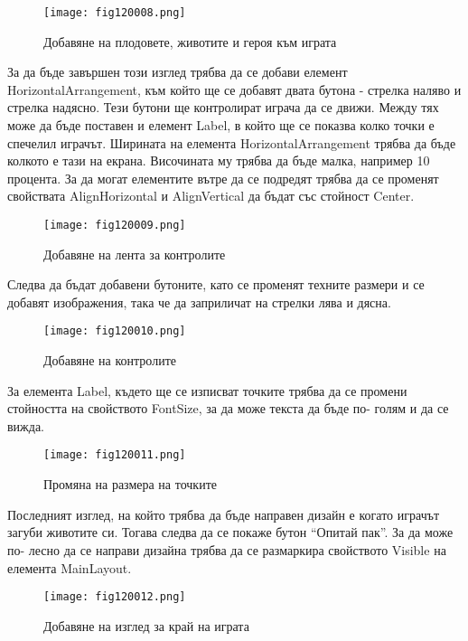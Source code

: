 \begin{figure}[H]
  \centering
  \texttt{[image: fig120008.png]}
  \caption{Добавяне на плодовете, животите и героя към играта}
\label{fig120008}
\end{figure}

За да бъде завършен този изглед трябва да се добави елемент HorizontalArrangement, към който ще се добавят двата бутона - стрелка наляво и стрелка надясно. Тези бутони ще контролират играча да се движи. Между тях може да бъде поставен и елемент Label, в който ще се показва колко точки е спечелил играчът.
Ширината на елемента HorizontalArrangement трябва да бъде колкото е тази на екрана. Височината му трябва да бъде малка, например 10 процента. За да могат елементите вътре да се подредят трябва да се променят свойствата AlignHorizontal и AlignVertical да бъдат със стойност Center.

\begin{figure}[H]
  \centering
  \texttt{[image: fig120009.png]}
  \caption{Добавяне на лента за контролите}
\label{fig120009}
\end{figure}

Следва да бъдат добавени бутоните, като се променят техните размери и се добавят изображения, така че да заприличат на стрелки лява и дясна. 

\begin{figure}[H]
  \centering
  \texttt{[image: fig120010.png]}
  \caption{Добавяне на контролите}
\label{fig120010}
\end{figure}

За елемента Label, където ще се изписват точките трябва да се промени стойността на свойството FontSize, за да може текста да бъде по- голям и да се вижда.

\begin{figure}[H]
  \centering
  \texttt{[image: fig120011.png]}
  \caption{Промяна на размера на точките}
\label{fig120011}
\end{figure}

Последният изглед, на който трябва да бъде направен дизайн е когато играчът загуби животите си. Тогава следва да се покаже бутон “Опитай пак”. За да може по- лесно да се направи дизайна трябва да се размаркира свойството Visible на елемента MainLayout.

\begin{figure}[H]
  \centering
  \texttt{[image: fig120012.png]}
  \caption{Добавяне на изглед за край на играта}
\label{fig120012}
\end{figure}

